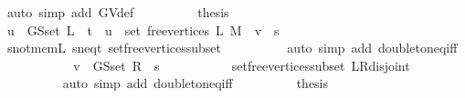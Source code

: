 \begin{isabellebody}
\ {\isacharparenleft}{\kern0pt}auto\ simp\ add{\isacharcolon}{\kern0pt}\ G{\isachardot}{\kern0pt}V{\isacharunderscore}{\kern0pt}def{\isacharparenright}{\kern0pt}\isanewline
\ \ \ \ \ \ \isamarkupfalse%
\ \isamarkupfalse%
\ {\isacharquery}{\kern0pt}thesis\isanewline
\ \ \ \ \ \ \ \ \isacommand{{\isachardot}{\kern0pt}}\isamarkupfalse%
\isanewline
\ \ \ \ \isamarkupfalse%
\isanewline
\ \ \ \ \ \ \isamarkupfalse%
\ {}\isanewline
\ \ \ \ \ \ \isamarkupfalse%
\ {\isachardoublequoteopen}u\ {\isasymin}\ G{\isachardot}{\kern0pt}S{\isachardot}{\kern0pt}set\ L\ {\isasymunion}\ {\isacharbraceleft}{\kern0pt}t{\isacharbraceright}{\kern0pt}\ {\isasymlongleftrightarrow}\ u\ {\isasymin}\ set\ {\isacharparenleft}{\kern0pt}free{\isacharunderscore}{\kern0pt}vertices\ L\ M{\isacharparenright}{\kern0pt}\ {\isasymand}\ v\ {\isacharequal}{\kern0pt}\ s{\isachardoublequoteclose}\isanewline
\ \ \ \ \ \ \ \ \isamarkupfalse%
\ s{\isacharunderscore}{\kern0pt}not{\isacharunderscore}{\kern0pt}mem{\isacharunderscore}{\kern0pt}L\ s{\isacharunderscore}{\kern0pt}neq{\isacharunderscore}{\kern0pt}t\ set{\isacharunderscore}{\kern0pt}free{\isacharunderscore}{\kern0pt}vertices{\isacharunderscore}{\kern0pt}subset\isanewline
\ \ \ \ \ \ \ \ \isamarkupfalse%
\ {\isacharparenleft}{\kern0pt}auto\ simp\ add{\isacharcolon}{\kern0pt}\ doubleton{\isacharunderscore}{\kern0pt}eq{\isacharunderscore}{\kern0pt}iff{\isacharparenright}{\kern0pt}\isanewline
\ \ \ \ \ \ \isamarkupfalse%
\ \isamarkupfalse%
\ {\isachardoublequoteopen}{\isachardot}{\kern0pt}{\isachardot}{\kern0pt}{\isachardot}{\kern0pt}\ {\isasymlongleftrightarrow}\ v\ {\isasymin}\ G{\isachardot}{\kern0pt}S{\isachardot}{\kern0pt}set\ R\ {\isasymunion}\ {\isacharbraceleft}{\kern0pt}s{\isacharbraceright}{\kern0pt}{\isachardoublequoteclose}\isanewline
\ \ \ \ \ \ \ \ \isamarkupfalse%
\ {}\ set{\isacharunderscore}{\kern0pt}free{\isacharunderscore}{\kern0pt}vertices{\isacharunderscore}{\kern0pt}subset\ L{\isacharunderscore}{\kern0pt}R{\isacharunderscore}{\kern0pt}disjoint\isanewline
\ \ \ \ \ \ \ \ \isamarkupfalse%
\ {\isacharparenleft}{\kern0pt}auto\ simp\ add{\isacharcolon}{\kern0pt}\ doubleton{\isacharunderscore}{\kern0pt}eq{\isacharunderscore}{\kern0pt}iff{\isacharparenright}{\kern0pt}\isanewline
\ \ \ \ \ \ \isamarkupfalse%
\ \isamarkupfalse%
\ {\isacharquery}{\kern0pt}thesis\isanewline
\ \ \ \ \ \ \ \ \isacommand{{\isachardot}{\kern0pt}}\isamarkupfalse%

\end{isabellebody}
